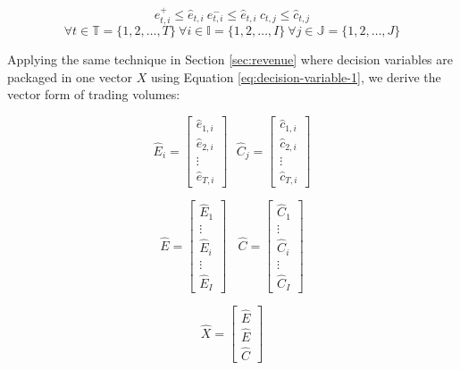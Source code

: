 \begin{equation*}
e^+_{t,i} \leq \hat{e}_{t,i}~e^-_{t,i} \leq \hat{e}_{t,i}~c_{t,j} \leq \hat{c}_{t,j}
\end{equation*}
\begin{equation*}
\forall t \in \mathbb{T} = \{1,2,\dots,T\}~\forall i \in \mathbb{I} = \{1,2,\dots,I\}~\forall j \in \mathbb{J} = \{1,2,\dots,J\}
\end{equation*}

Applying the same technique in Section \ref{sec:revenue} where decision variables are packaged in one vector $X$ using Equation \eqref{eq:decision-variable-1}, we derive the vector form of trading volumes:

	\begin{equation*}
	\hat{E}_{i} = 
	\begin{bmatrix}
	\hat{e}_{1,i}\\\hat{e}_{2,i}\\\vdots\\\hat{e}_{T,i}
	\end{bmatrix} ~~~
	\hat{C}_{j} = 
	\begin{bmatrix}
	\hat{c}_{1,i}\\\hat{c}_{2,i}\\\vdots\\\hat{c}_{T,i}
	\end{bmatrix}
	\end{equation*}
	
	\begin{equation*}
	\hat{E} = 
	\begin{bmatrix}
	\hat{E}_{1} \\ \vdots \\ \hat{E}_{i} \\ \vdots\\\hat{E}_{I} 
	\end{bmatrix} ~~~~
	\hat{C} = 
	\begin{bmatrix}
	\hat{C}_{1} \\ \vdots \\ \hat{C}_{i} \\ \vdots\\\hat{C}_{I} 
	\end{bmatrix}
	\end{equation*}
	
	\begin{equation}
	\hat{X} =
	\begin{bmatrix}
	\hat{E} \\ \hat{E} \\\hat{C}
	\end{bmatrix}
	\end{equation}

